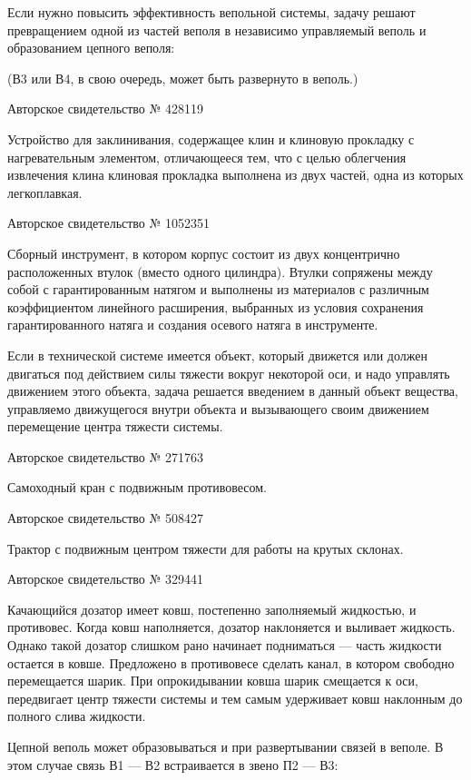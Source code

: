 Если  нужно повысить  эффективность вепольной  системы, задачу  решают
превращением одной из частей веполя  в независимо управляемый веполь и
образованием цепного веполя:


(В3 или В4, в свою очередь, может быть развернуто в веполь.)


Авторское свидетельство № 428119

Устройство для  заклинивания, содержащее  клин и клиновую  прокладку с
нагревательным  элементом, отличающееся  тем, что  с целью  облегчения
извлечения клина клиновая прокладка выполнена  из двух частей, одна из
которых легкоплавкая.


Авторское свидетельство № 1052351

Сборный  инструмент, в  котором  корпус состоит  из двух  концентрично
расположенных втулок (вместо одного  цилиндра). Втулки сопряжены между
собой с гарантированным натягом и  выполнены из материалов с различным
коэффициентом  линейного расширения,  выбранных из  условия сохранения
гарантированного натяга и создания осевого натяга в инструменте.

Если в технической системе имеется объект, который движется или должен
двигаться  под действием  силы тяжести  вокруг некоторой  оси, и  надо
управлять движением этого объекта,  задача решается введением в данный
объект вещества,  управляемо движущегося внутри объекта  и вызывающего
своим движением перемещение центра тяжести системы.


Авторское свидетельство № 271763

Самоходный кран с подвижным противовесом.


Авторское свидетельство № 508427

Трактор с подвижным центром тяжести для работы на крутых склонах.


Авторское свидетельство № 329441

Качающийся  дозатор имеет  ковш, постепенно  заполняемый жидкостью,  и
противовес.  Когда ковш  наполняется, дозатор  наклоняется и  выливает
жидкость.  Однако такой  дозатор слишком  рано начинает  подниматься —
часть  жидкости остается  в  ковше. Предложено  в противовесе  сделать
канал, в котором свободно  перемещается шарик. При опрокидывании ковша
шарик смещается к  оси, передвигает центр тяжести системы  и тем самым
удерживает ковш наклонным до полного слива жидкости.


Цепной  веполь  может  образовываться  и при  развертывании  связей  в
веполе. В этом случае связь В1 — В2 встраивается в звено П2 — В3:


